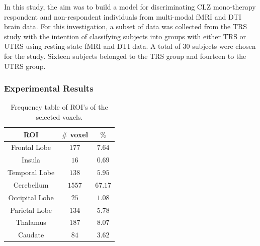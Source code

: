 In this study, the aim was to build a model for discriminating CLZ mono-therapy respondent and non-respondent individuals from multi-modal fMRI and DTI brain data. For this investigation, a subset of data was collected from the TRS study with the intention of classifying subjects into groups with either TRS or UTRS using resting-state fMRI and DTI data. A total of $30$ subjects were chosen for the study. Sixteen subjects belonged to the TRS group and fourteen to the UTRS group. 

\subsubsection{Experimental Results}

         

\begin{table}
	\centering
	\caption{Frequency table of ROI's of the selected voxels.}
	\label{tab:vox_freq}
	\begin{tabular}{@{}ccc@{}}
		\toprule\toprule
		\textbf{ROI} & \textbf{$\#$ voxel} & \textbf{$\%$}\\ \midrule
		Frontal Lobe  &    $177$  &    $7.64$ \\ 
		Insula    &   $16$  &   $0.69$ \\ 
		Temporal Lobe   &   $138$  &    $5.95$ \\ 
		Cerebellum  &   $1557$  &   $67.17$ \\ 
		Occipital Lobe   &    $25$  &    $1.08$ \\ 
		Parietal Lobe    &  $134$  &    $5.78$ \\ 
		Thalamus   &   $187$  &    $8.07$ \\ 
		Caudate   &    $84$   &   $3.62$ \\
		\bottomrule\bottomrule
	\end{tabular}%
\end{table}           

